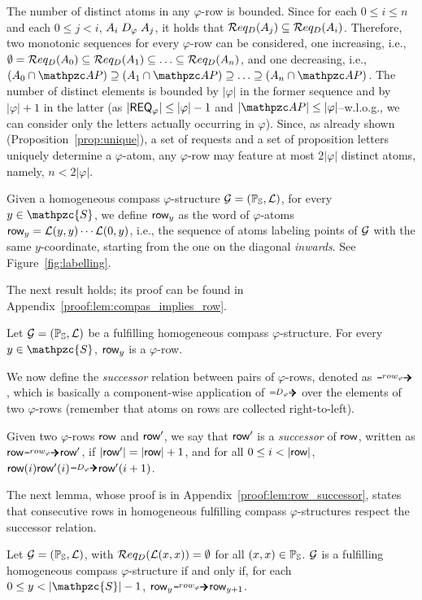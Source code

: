 The number of distinct atoms in any $\varphi$-row is bounded. 
Since for each $0\leq i \leq n$ and each $0\leq j<i$, $A_i \mathrel{D_\varphi} A_j$,
it holds that $\mathcal{R} eq_D(A_j) \subseteq \mathcal{R} eq_D(A_i)$.  
Therefore, two monotonic sequences for every 
$\varphi$-row can be considered, one increasing, i.e., $\emptyset=\mathcal{R} eq_D(A_0) \subseteq \mathcal{R} eq_D(A_1)\subseteq \ldots \subseteq \mathcal{R} eq_D(A_n)$,
and one decreasing, i.e., $(A_0 \cap \AP)\supseteq (A_1\cap \AP)\supseteq \ldots \supseteq (A_n\cap \AP)$. 
The number of distinct elements is bounded by $|\varphi|$ in the former sequence and by $|\varphi|+1$ in the latter (as $|\mathsf{REQ}_{\varphi}|\leq |\varphi|-1$ and $|\AP|\leq |\varphi|$--w.l.o.g., we can consider only the letters actually occurring in $\varphi$). Since, as already shown (Proposition~\ref{prop:unique}), a set of requests and a set of proposition letters uniquely determine a $\varphi$-atom, any $\varphi$-row may feature at most $2|\varphi|$ distinct atoms, namely, $n<2|\varphi|$.  

Given a homogeneous compass $\varphi$-structure $\mathcal{G}= (\mathbb{P}_{\mathbb{S}},\mathcal{L})$, for every  $y\in \mathpzc{S}$, we define $\text{{\sffamily row}}_y$ as the word of $\varphi$-atoms $\text{{\sffamily row}}_y=\mathcal{L}(y,y)\cdots \mathcal{L}(0, y)$, i.e., the sequence of atoms labeling points of $\mathcal{G}$ with the same $y$-coordinate, starting from the one on the diagonal \emph{inwards}. See Figure~\ref{fig:labelling}. 

The next result holds; its proof can be found in Appendix~\ref{proof:lem:compas_implies_row}.
\begin{lemma}\label{lem:compas_implies_row}
Let $\mathcal{G}= (\mathbb{P}_{\mathbb{S}},\mathcal{L})$ be a fulfilling homogeneous compass $\varphi$-structure. For every $y\in \mathpzc{S}$, $\text{{\sffamily row}}_y$ is a $\varphi$-row.
\end{lemma}
%

We now define the \emph{successor} relation between pairs of $\varphi$-rows, denoted as $\rownext$, which is basically a component-wise application of $\genDphi$ over the elements of two $\varphi$-rows (remember that atoms on rows are collected right-to-left).
%
\begin{definition}\label{def:rownext}
Given two $\varphi$-rows $\text{{\sffamily row}}$ and $\text{{\sffamily row}}'$, we say that $\text{{\sffamily row}}'$ is a \emph{successor}
of $\text{{\sffamily row}}$, written as $\row \rownext \row'$, if $|\text{{\sffamily row}}'| = |\text{{\sffamily row}}| +1$, and for all $0\leq i < |\text{{\sffamily row}}|$,
$\row(i)\row'(i) \genDphi \row'(i+1)$. 
\end{definition}

The next lemma, whose proof is in Appendix~\ref{proof:lem:row_successor}, states that consecutive  rows in homogeneous fulfilling compass $\varphi$-structures respect the successor relation.
%
\begin{lemma}\label{lem:row_successor}
Let $\mathcal{G}=(\mathbb{P}_{\mathbb{S}},\mathcal{L})$, with $\mathcal{R} eq_D(\mathcal{L}(x,x))=\emptyset$ for all $(x,x)\in\mathbb{P}_{\mathbb{S}}$. $\mathcal{G}$ is a fulfilling homogeneous compass $\varphi$-structure
if and only if, for each $0\leq y < |\mathpzc{S}| -1$, $\row_y \rownext \row_{y+1}$.
\end{lemma}
%


